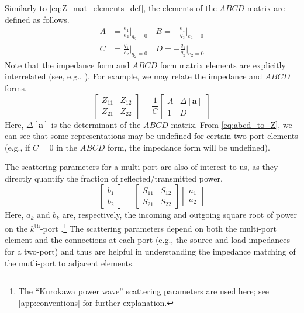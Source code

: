 \documentclass[5p,times]{elsarticle}
\begin{document}
%
Similarly to \eqref{eq:Z_mat_elements_def}, the elements of the $ABCD$ matrix are defined as follows.
%
\begin{subequations} \label{eq:abcd_mat_elements_def}
        \begin{align}
                A &= \frac{e_1}{e_2} \bigg \vert_{q_2=0}  \quad
                B = - \frac{e_1}{q_2} \bigg \vert_{e_2=0}  \\[1em]
                C &= \frac{q_1}{e_2} \bigg \vert_{q_2=0}  \quad
                D = - \frac{q_1}{q_2} \bigg \vert_{e_2=0} 
        \end{align}
\end{subequations}
%
Note that the impedance form and $ABCD$ form matrix elements are explicitly interrelated (see, e.g., \cite{CircuitFundamental}).
For example, we may relate the impedance and $ABCD$ forms.
%
\begin{equation}
        \begin{bmatrix}
                Z_{11} & Z_{12} \\ Z_{21} & Z_{22}
        \end{bmatrix}
        =
        \frac{1}{C}
        \begin{bmatrix}
                A & \Delta \left[ \mathbf{a} \right] \\ 1 & D
        \end{bmatrix}
\label{eq:abcd_to_Z}
\end{equation}
%
Here, $\Delta \left[ \mathbf{a} \right]$ is the determinant of the $ABCD$ matrix.
From \eqref{eq:abcd_to_Z}, we can see that some representations may be undefined for certain two-port elements (e.g., if $C=0$ in the $ABCD$ form, the impedance form will be undefined).

The scattering parameters for a multi-port are also of interest to us, as they directly quantify the fraction of reflected/transmitted power.
%
\begin{equation}
        \begin{bmatrix}
        b_1 \\
        b_2
        \end{bmatrix}
        = 
        \begin{bmatrix}
        S_{11} & S_{12} \\
        S_{21} & S_{22}
        \end{bmatrix}
        \begin{bmatrix}
        a_1 \\
        a_2
        \end{bmatrix}
        \label{eq:scattering_matrix}
\end{equation}
%
Here, $a_k$ and $b_k$ are, respectively, the incoming and outgoing square root of power on the $k^{\textrm{th}}$-port \cite{Amakawa:2016aa}.\footnote{The ``Kurokawa power wave'' scattering parameters are used here; see \ref{app:conventions} for further explanation.}
The scattering parameters depend on both the multi-port element and the connections at each port (e.g., the source and load impedances for a two-port) and thus are helpful in understanding the impedance matching of the mutli-port to adjacent elements.
\end{document}
